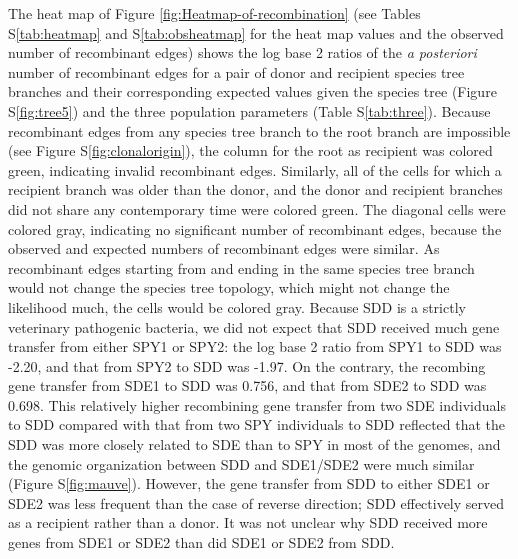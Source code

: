 \documentclass[english]{article}
\begin{document}
The heat map of Figure \ref{fig:Heatmap-of-recombination} (see Tables
S\ref{tab:heatmap} and S\ref{tab:obsheatmap} for the heat map values and the
observed number of recombinant edges) shows the log base 2 ratios of the
\textit{a posteriori} number of recombinant edges for a pair of donor and
recipient species tree branches and their corresponding expected values given
the species tree (Figure S\ref{fig:tree5}) and the three population parameters
(Table S\ref{tab:three}).  Because recombinant edges from any species tree
branch to the root branch are impossible (see Figure S\ref{fig:clonalorigin}),
the column for the root as recipient was colored green, indicating invalid
recombinant edges.  Similarly, all of the cells for which a recipient branch was
older than the donor, and the donor and recipient branches did not share any contemporary time were
colored green. The diagonal cells were colored gray, indicating no significant
number of recombinant edges, because the observed and expected numbers of
recombinant edges were similar. As recombinant edges starting from and ending in
the same species tree branch would not change the species tree topology, which
might not
change the likelihood much, the cells would be colored gray.  Because SDD is a
strictly veterinary pathogenic bacteria, we did not expect that SDD received
much gene transfer from either SPY1 or SPY2: the log base 2 ratio from SPY1 to
SDD was -2.20, and that from SPY2 to SDD was -1.97.  On the contrary, the
recombing gene transfer from SDE1 to SDD was 0.756, and that from SDE2 to SDD
was 0.698. This relatively higher recombining gene transfer from two SDE
individuals to SDD compared with that from two SPY individuals to SDD reflected
that the SDD was more closely related to SDE than to SPY in most of the genomes,
and the genomic organization between SDD and SDE1/SDE2 were much similar
(Figure S\ref{fig:mauve}).  However, the gene transfer from SDD to either SDE1
or SDE2 was less frequent than the case of reverse direction; SDD effectively
served as a recipient rather than a donor. It was not unclear why SDD received
more genes from SDE1 or SDE2 than did SDE1 or SDE2 from SDD.  
\end{document}
